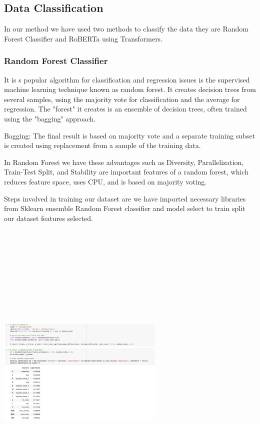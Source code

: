 \subsection{Data Classification}

In our method we have used two methods to classify the data they are  Random Forest Classifier and RoBERTa using Transformers.

\subsubsection{Random Forest Classifier}

It is s popular algorithm for classification and regression issues is the supervised machine learning technique known as random forest. It creates decision trees from several samples, using the majority vote for classification and the average for regression.
The "forest" it creates is an ensemble of decision trees, often trained using the "bagging" approach.

 Bagging: The final result is based on majority vote and a separate training subset is created using replacement from a sample of the training data. 

In Random Forest we have these advantages such as Diversity, Parallelization, Train-Test Split, and Stability are important features of a random forest, which reduces feature space, uses CPU, and is based on majority voting.

Steps involved in training our dataset are we have imported necessary libraries from Sklearn ensemble Random Forest classifier and model select to train split our dataset features selected.

\includegraphics[width=8cm, height=15cm ]{rf.jpeg}

